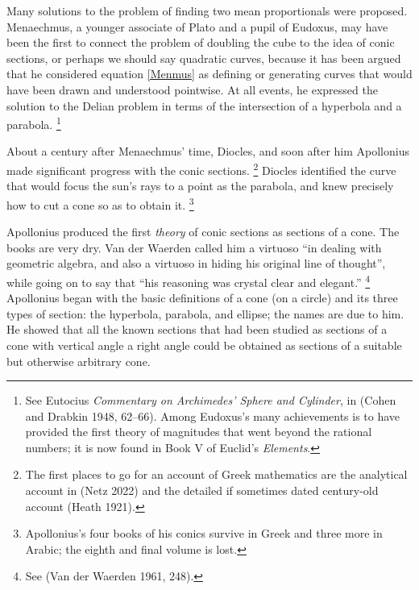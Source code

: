 Many solutions to the problem of finding two mean proportionals were
proposed.
Menaechmus, a younger associate of Plato and a pupil of Eudoxus,
%
may
have been the first to connect the problem of doubling the cube to the
idea of conic sections, or perhaps we should say quadratic curves,
%
because it has been argued that he considered equation \eqref{Menmus}
as defining or generating curves that would have been drawn and
understood pointwise. At all events, he expressed the solution to the
Delian problem in terms of the intersection of a hyperbola
%
and a
parabola.
%
%
\footnote{See Eutocius 
%
\emph{Commentary on Archimedes' Sphere
  and Cylinder}, in (Cohen and Drabkin 1948, 62--66).
  Among Eudoxus's many achievements is to have provided the first
  theory of
  magnitudes that went beyond the rational numbers; it is now found in
  Book V of Euclid's
%
\emph{Elements}.}

About a century after Menaechmus' time, Diocles,
%
 and soon
after him Apollonius
%
 made significant progress with the conic
sections.%
%
\footnote{The first places to go for an account of Greek
mathematics are the analytical account in (Netz 2022) and the detailed
if sometimes dated century-old account (Heath 1921).}
%
Diocles identified the curve that would focus the sun's rays to a point
as the parabola, and knew precisely how to cut a cone so as to obtain it.%
%
\footnote{Apollonius's four books of his conics survive in Greek and
three more in Arabic; the eighth and final volume is lost.}


Apollonius produced the first \emph{theory} of conic sections
%
as sections
of a cone.
The books are very dry. Van der Waerden
%
called him a virtuoso ``in dealing
with geometric algebra, and also a virtuoso in hiding his original line
of thought'', while going on to say that ``his reasoning was crystal
clear and elegant.''%
%
\footnote{See (Van der Waerden 1961, 248).}
%
Apollonius began with the basic definitions of a cone (on a circle)
and its three types of section: the hyperbola, parabola, and ellipse;
%
the names are due to him. He showed that all the known sections that
had been studied as sections of a cone with vertical angle a right angle
could be obtained as sections of a suitable but otherwise arbitrary cone.

